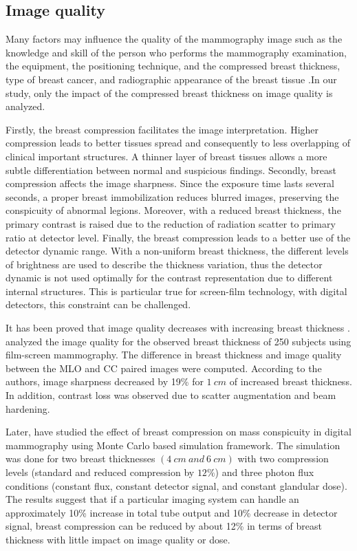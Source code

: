 \subsection{Image quality}

Many factors may influence the quality of the mammography image such as the knowledge and skill of the person who performs the mammography examination, the equipment, the positioning
technique, and the compressed breast thickness, type of breast
cancer, and radiographic appearance of the breast tissue \citep{de_pain_2015,andolina2011mammographic}.In our study, only the impact of the compressed breast thickness on image quality is analyzed.

 Firstly, the breast compression facilitates the image interpretation. Higher compression leads to better tissues spread and consequently to less overlapping of clinical important structures. A thinner layer of breast tissues allows a more subtle differentiation between normal and suspicious findings. Secondly, breast compression affects the image sharpness. Since the exposure time lasts several seconds, a proper breast immobilization reduces blurred images, preserving the conspicuity of abnormal legions. Moreover, with a reduced breast thickness, the primary contrast is raised due to the reduction of radiation scatter to primary ratio at detector level. Finally, the breast compression leads to a better use of the detector dynamic range. With a non-uniform breast thickness, the different levels of brightness are used to describe the thickness variation, thus the detector dynamic is not used optimally for the contrast representation due to different internal structures. This is particular true for screen-film technology, with digital detectors, this constraint can be challenged.

It has been proved that image quality decreases with increasing breast thickness \citep{ko_dose_2013,helvie_breast_1994,saunders_effect_2008,poulos_breast_2003}. \cite{helvie_breast_1994} analyzed the image quality for the observed breast thickness of 250 subjects using film-screen mammography.  The difference in breast thickness and image quality between the MLO and CC paired images were computed. According to the authors, image sharpness decreased by 19\% for $1\ cm$ of increased breast thickness. In addition, contrast loss was observed due to scatter augmentation and beam hardening.

Later, \cite{saunders_effect_2008} have studied the effect of breast compression on mass conspicuity in digital mammography using Monte Carlo based simulation framework. The simulation was done for two breast thicknesses $(4\ cm\ and\ 6\ cm)$ with two compression levels (standard and reduced compression by $12\%$) and three photon flux conditions (constant
flux, constant detector signal, and constant glandular dose). The results suggest that if a particular imaging system can handle an approximately 10\% increase in total tube output and 10\% decrease in detector signal, breast compression can be reduced by about 12\% in terms of breast thickness with little impact on image quality or dose.

